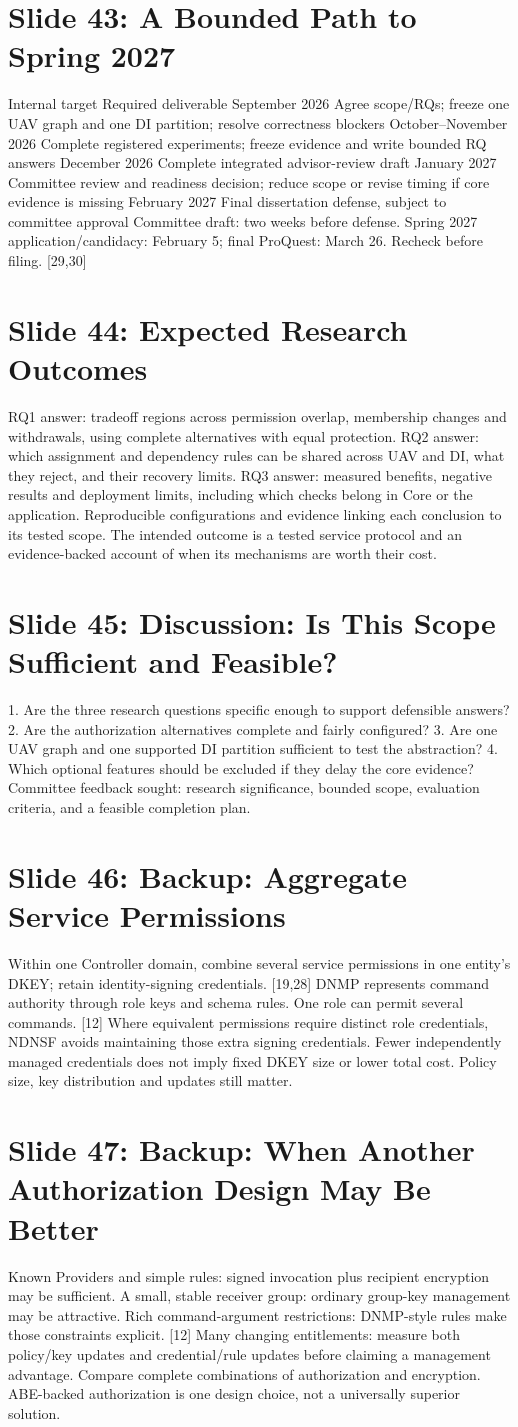 \documentclass[11pt]{article}
\newcommand{\slideentry}[3]{\section*{Slide #1: #2}#3\par}
\begin{document}
\slideentry{43}{A Bounded Path to Spring 2027}{
Internal target Required deliverable September 2026 Agree scope/RQs; freeze one UAV graph and one DI partition; resolve correctness blockers October--November 2026 Complete registered experiments; freeze evidence and write bounded RQ answers December 2026 Complete integrated advisor-review draft January 2027 Committee review and readiness decision; reduce scope or revise timing if core evidence is missing February 2027 Final dissertation defense, subject to committee approval Committee draft: two weeks before defense. Spring 2027 application/candidacy: February 5; final ProQuest: March 26. Recheck before filing. [29,30]
}
\slideentry{44}{Expected Research Outcomes}{
RQ1 answer: tradeoff regions across permission overlap, membership changes and withdrawals, using complete alternatives with equal protection. RQ2 answer: which assignment and dependency rules can be shared across UAV and DI, what they reject, and their recovery limits. RQ3 answer: measured benefits, negative results and deployment limits, including which checks belong in Core or the application. Reproducible configurations and evidence linking each conclusion to its tested scope. The intended outcome is a tested service protocol and an evidence-backed account of when its mechanisms are worth their cost.
}
\slideentry{45}{Discussion: Is This Scope Sufficient and Feasible?}{
1. Are the three research questions specific enough to support defensible answers? 2. Are the authorization alternatives complete and fairly configured? 3. Are one UAV graph and one supported DI partition sufficient to test the abstraction? 4. Which optional features should be excluded if they delay the core evidence? Committee feedback sought: research significance, bounded scope, evaluation criteria, and a feasible completion plan.
}
\slideentry{46}{Backup: Aggregate Service Permissions}{
Within one Controller domain, combine several service permissions in one entity’s DKEY; retain identity-signing credentials. [19,28] DNMP represents command authority through role keys and schema rules. One role can permit several commands. [12] Where equivalent permissions require distinct role credentials, NDNSF avoids maintaining those extra signing credentials. Fewer independently managed credentials does not imply fixed DKEY size or lower total cost. Policy size, key distribution and updates still matter.
}
\slideentry{47}{Backup: When Another Authorization Design May Be Better}{
Known Providers and simple rules: signed invocation plus recipient encryption may be sufficient. A small, stable receiver group: ordinary group-key management may be attractive. Rich command-argument restrictions: DNMP-style rules make those constraints explicit. [12] Many changing entitlements: measure both policy/key updates and credential/rule updates before claiming a management advantage. Compare complete combinations of authorization and encryption. ABE-backed authorization is one design choice, not a universally superior solution.
}
\end{document}
